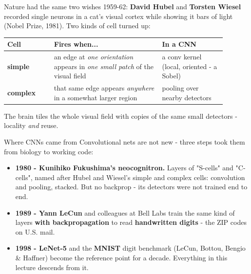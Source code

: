 \documentclass[aspectratio=169]{beamer}
\begin{document}
\begin{frame}{Nature had the same two wishes}
  \small
  1959-62: \textbf{David Hubel} and \textbf{Torsten Wiesel} recorded single neurons in a
  cat's visual cortex while showing it bars of light (Nobel Prize, 1981). Two kinds of
  cell turned up:
  \vskip 6pt
  \begin{center}
    \begin{tabular}{p{0.19\linewidth} p{0.44\linewidth} p{0.26\linewidth}}
      \textbf{Cell} & \textbf{Fires when...} & \textbf{In a CNN}\\
      \hline
      \textbf{simple} & an edge at \emph{one orientation} appears in \emph{one small
        patch} of the visual field & a conv kernel (local, oriented - a Sobel)\\[3pt]
      \textbf{complex} & that same edge appears \emph{anywhere} in a somewhat larger
        region & pooling over nearby detectors\\
    \end{tabular}
  \end{center}
  \vskip 6pt
  The brain tiles the whole visual field with copies of the same small detectors -
  locality \emph{and} reuse.
  \vskip 6pt
\end{frame}

\begin{frame}{Where CNNs came from}
  Convolutional nets are not new - three steps took them from biology to working code:
  \vskip 6pt
  \begin{itemize}
    \item \textbf{1980 - Kunihiko Fukushima's neocognitron.} Layers of "S-cells" and
      "C-cells", named after Hubel and Wiesel's simple and complex cells: convolution and
      pooling, stacked. But no backprop - its detectors were not trained end to end.
    \item \textbf{1989 - Yann LeCun} and colleagues at Bell Labs train the same kind of
      layers \textbf{with backpropagation} to read \textbf{handwritten digits} - the ZIP
      codes on U.S. mail.
    \item \textbf{1998 - LeNet-5} and the \textbf{MNIST} digit benchmark (LeCun, Bottou,
      Bengio \& Haffner) become the reference point for a decade. Everything in this
      lecture descends from it.
  \end{itemize}
  \vskip 6pt
\end{frame}
\end{document}
